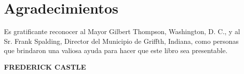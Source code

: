 \chapter*{Agradecimientos}
Es gratificante reconocer al Mayor Gilbert Thompson, Washington, D. C., y al Sr. Frank Spalding, Director del Municipio de Griffth, Indiana, como personas que brindaron una valiosa ayuda para hacer que este libro sea presentable.

\begin{flushright}
\textbf{FREDERICK CASTLE}
\end{flushright}
